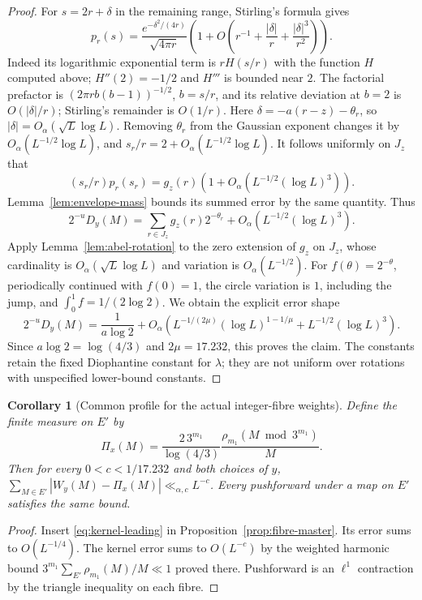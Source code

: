 \documentclass[11pt]{article}
\newtheorem{corollary}[proposition]{Corollary}
\theoremstyle{remark}\newtheorem{remark}[proposition]{Remark}
\begin{document}
\begin{proof}
For $s=2r+\delta$ in the remaining range, Stirling's formula gives
\[
 p_r(s)=\frac{e^{-\delta^2/(4r)}}{\sqrt{4\pi r}}
 \left(1+O\left(r^{-1}+\frac{|\delta|}{r}
                         +\frac{|\delta|^3}{r^2}\right)\right).
\]
Indeed its logarithmic exponential term is $rH(s/r)$ with the
function $H$ computed above; $H''(2)=-1/2$ and $H'''$ is bounded
near $2$. The factorial prefactor is
$(2\pi r b(b-1))^{-1/2}$, $b=s/r$, and its relative deviation at
$b=2$ is $O(|\delta|/r)$; Stirling's remainder is $O(1/r)$.
Here $\delta=-a(r-z)-\theta_r$, so $|\delta|=O_\alpha(\sqrt L\log L)$.
Removing $\theta_r$ from the Gaussian exponent changes it by
$O_\alpha(L^{-1/2}\log L)$, and $s_r/r=2+O_\alpha(L^{-1/2}\log L)$.
It follows uniformly on $J_z$ that
\[
 (s_r/r)p_r(s_r)=g_z(r)
       \left(1+O_\alpha(L^{-1/2}(\log L)^3)\right).
\]
Lemma~\ref{lem:envelope-mass} bounds its summed error by the same
quantity. Thus
\[
 2^{-u}D_y(M)
 =\sum_{r\in J_z}g_z(r)2^{-\theta_r}
       +O_\alpha(L^{-1/2}(\log L)^3).
\]
Apply Lemma~\ref{lem:abel-rotation} to the zero extension of $g_z$ on
$J_z$, whose cardinality is $O_\alpha(\sqrt L\log L)$ and variation
is $O_\alpha(L^{-1/2})$. For $f(\theta)=2^{-\theta}$, periodically
continued with $f(0)=1$, the circle variation is $1$, including the
jump, and $\int_0^1f=1/(2\log2)$. We obtain the explicit error shape
\begin{equation}\label{eq:kernel-error-shape}
 2^{-u}D_y(M)=\frac1{a\log2}
 +O_\alpha\left(
 L^{-1/(2\mu)}(\log L)^{1-1/\mu}
       +L^{-1/2}(\log L)^3\right).
\end{equation}
Since $a\log2=\log(4/3)$ and $2\mu=17.232$, this proves the claim.
The constants retain the fixed Diophantine constant for $\lambda$;
they are not uniform over rotations with unspecified lower-bound constants.
\end{proof}

\begin{corollary}[Common profile for the actual integer-fibre weights]
\label{cor:fibre-leading}
Define the finite measure on $E'$ by
\[
 \Pi_x(M)=\frac{2\,3^{m_1}}{\log(4/3)}
                     \frac{\rho_{m_1}(M\bmod3^{m_1})}{M}.
\]
Then for every $0<c<1/17.232$ and both choices of $y$,
$\sum_{M\in E'}|W_y(M)-\Pi_x(M)|\ll_{\alpha,c}L^{-c}$.
Every pushforward under a map on $E'$ satisfies the same bound.
\end{corollary}
\begin{proof}
Insert \eqref{eq:kernel-leading} in Proposition~\ref{prop:fibre-master}.
Its error sums to $O(L^{-1/4})$. The kernel error sums to $O(L^{-c})$
by the weighted harmonic bound
$3^{m_1}\sum_{E'}\rho_{m_1}(M)/M\ll1$ proved there. Pushforward
is an $\ell^1$ contraction by the triangle inequality on each fibre.
\end{proof}
\end{document}
